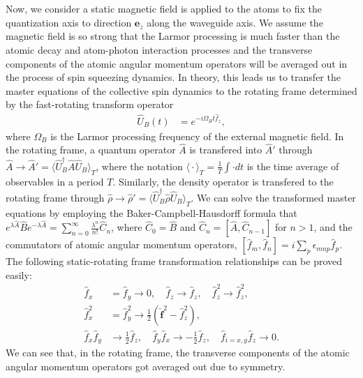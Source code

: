 \documentclass[preprint,aps,pra,onecolumn,superscriptaddress]{revtex4-1} %
\newcommand{\expect}[1]{\big\langle #1 \big\rangle}
\begin{document}
\begin{appendix}
Now, we consider a static magnetic field is applied to the atoms to fix the quantization axis to direction $ \mathbf{e}_{\tilde{z}} $ along the waveguide axis.
We assume the magnetic field is so strong that the Larmor processing is much faster than the atomic decay and atom-photon interaction processes and the transverse components of the atomic angular momentum operators will be averaged out in the process of spin squeezing dynamics.
In theory, this leads us to transfer the master equations of the collective spin dynamics to the rotating frame determined by the fast-rotating transform operator
\begin{align}
\hat{U}_B(t) &= e^{-i\Omega_Bt\hat{f}_z},
\end{align}
where $ \Omega_B $ is the Larmor processing frequency of the external magnetic field.
In the rotating frame, a quantum operator $ \hat{A} $ is transfered into $ \hat{A}' $ through $ \hat{A}\rightarrow \hat{A}'=\expect{\hat{U}_B^\dagger\hat{A}\hat{U}_B }_T $, where the notation $ \expect{\cdot}_T=\frac{1}{T}\int\cdot dt $ is the time average of observables in a period $ T $.
Similarly, the density operator is transfered to the rotating frame through $ \hat{\rho}\rightarrow \hat{\rho}'= \expect{\hat{U}_B^\dagger\hat{\rho}\hat{U}_B }_T $.
We can solve the transformed master equations by employing the Baker-Campbell-Hausdorff formula that $ e^{\lambda\hat{A}}\hat{B}e^{-\lambda\hat{A}}=\sum_{n=0}^\infty\frac{\lambda^n}{n!}\hat{C}_n $, where $ \hat{C}_0=\hat{B} $ and $ \hat{C}_n=\left[\hat{A},\hat{C}_{n-1} \right] $ for $ n>1 $, and the commutators of atomic angular momentum operators, $ \left[\hat{f}_m, \hat{f}_n\right]=i\sum_p\epsilon_{mnp}\hat{f}_p $.
The following static-rotating frame transformation relationships can be proved easily:
\begin{subequations}\label{eq:rotationtransf}
	\begin{align}
	\hat{f}_{x}&=\hat{f}_{y} \rightarrow 0, \quad \hat{f}_{z}\rightarrow\hat{f}_z, \quad \hat{f}_{z}^ 2\rightarrow\hat{f}_z^2,\\
	\hat{f}^2_{x} &= \hat{f}^ 2_{y} \rightarrow \frac{1}{2}(\hat{\mathbf{f}}^2-\hat{f}_z^2),\\
	\hat{f}_{x}\hat{f}_{y} &\rightarrow\frac{1}{2}\hat{f}_z,\quad \hat{f}_{y}\hat{f}_{x}\rightarrow -\frac{1}{2}\hat{f}_z,\quad \hat{f}_{i=x,y}\hat{f}_{z}\rightarrow 0.
	\end{align}
\end{subequations}
We can see that, in the rotating frame, the transverse components of the atomic angular momentum operators got averaged out due to symmetry.


\end{appendix}
\end{document}
